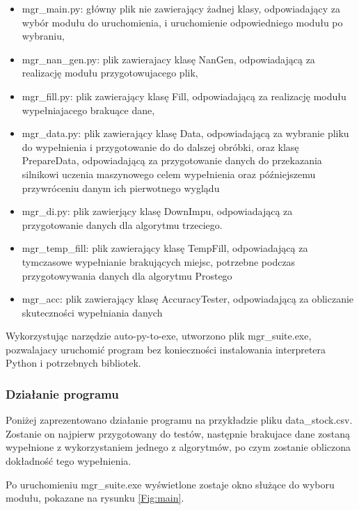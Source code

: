 \documentclass[12pt,twoside]{article}
\begin{document}
\begin{itemize}[label=-,labelsep=0.4cm, leftmargin=1.25cm]
    \item mgr\_main.py: główny plik nie zawierający żadnej klasy, odpowiadający za wybór modułu do uruchomienia,
          i uruchomienie odpowiedniego modułu po wybraniu,
    \item mgr\_nan\_gen.py: plik zawierajacy klasę NanGen, odpowiadającą za realizację modułu przygotowujacego plik,
    \item mgr\_fill.py: plik zawierający klasę Fill, odpowiadającą za realizację modułu wypełniajacego brakuące dane,
    \item mgr\_data.py: plik zawierający klasę Data,
          odpowiadającą za wybranie pliku do wypełnienia i przygotowanie do do dalszej obróbki, oraz klasę PrepareData,
          odpowiadającą za przygotowanie danych do przekazania silnikowi uczenia maszynowego celem wypełnienia
          oraz późniejszemu przywróceniu danym ich pierwotnego wyglądu
    \item mgr\_di.py: plik zawierjący klasę DownImpu,
          odpowiadającą za przygotowanie danych dla algorytmu trzeciego.
    \item mgr\_temp\_fill: plik zawierający klasę TempFill, odpowiadającą za tymczasowe wypełnianie brakujących miejsc,
          potrzebne podczas przygotowywania danych dla algorytmu Prostego
    \item mgr\_acc: plik zawierający klasę AccuracyTester, odpowiadającą za obliczanie skuteczności wypełniania danych
\end{itemize}

Wykorzystując narzędzie auto-py-to-exe, utworzono plik mgr\_suite.exe,
pozwalajacy uruchomić program bez konieczności instalowania interpretera Python i potrzebnych bibliotek. \cite{autopy}

\subsubsection{Działanie programu}
Poniżej zaprezentowano działanie programu na przykładzie pliku data\_stock.csv.
Zostanie on najpierw przygotowany do testów,
następnie brakujace dane zostaną wypełnione z wykorzystaniem jednego z algorytmów,
po czym zostanie obliczona dokładność tego wypełnienia.

\vspace{5mm}
Po uruchomieniu mgr\_suite.exe wyświetlone zostaje okno służące do wyboru modułu, pokazane na rysunku \ref{Fig:main}.
\end{document}
